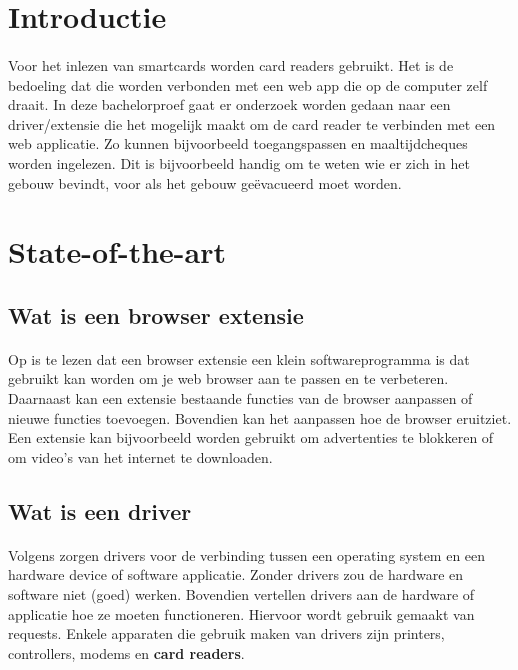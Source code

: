 
\section{Introductie}%
\label{sec:introductie}
\paragraph{}
Voor het inlezen van smartcards worden card readers gebruikt. Het is de bedoeling dat die worden verbonden met een web app die op de computer zelf draait. In deze bachelorproef gaat er onderzoek worden gedaan naar een driver/extensie die het mogelijk maakt om de card reader te verbinden met een web applicatie. Zo kunnen bijvoorbeeld toegangspassen en maaltijdcheques worden ingelezen. Dit is bijvoorbeeld handig om te weten wie er zich in het gebouw bevindt, voor als het gebouw geëvacueerd moet worden.


\section{State-of-the-art}%
\label{sec:state-of-the-art}

\bigskip
\subsection{Wat is een browser extensie}
\paragraph{}
Op \textcite{Desktop.com} is te lezen dat een browser extensie een klein softwareprogramma is dat gebruikt kan worden om je web browser aan te passen en te verbeteren. Daarnaast kan een extensie bestaande functies van de browser aanpassen of nieuwe functies toevoegen. Bovendien kan het aanpassen hoe de browser eruitziet.
Een extensie kan bijvoorbeeld worden gebruikt om advertenties te blokkeren of om video's van het internet te downloaden.

\bigskip
\subsection{Wat is een driver}
\paragraph{}
Volgens \textcite{Webopedia} zorgen drivers voor de verbinding tussen een operating system en een hardware device of software applicatie. Zonder drivers zou de hardware en software niet (goed) werken. Bovendien vertellen drivers aan de hardware of applicatie hoe ze moeten functioneren. Hiervoor wordt gebruik gemaakt van requests. Enkele apparaten die gebruik maken van drivers zijn printers, controllers, modems en \textbf{card readers}.

